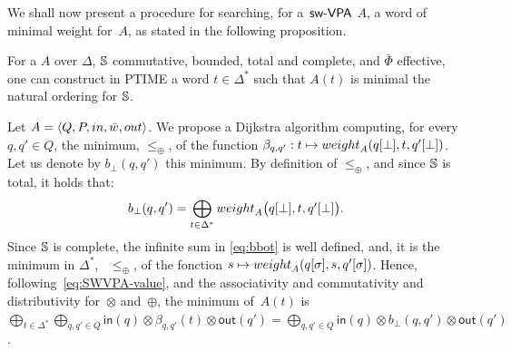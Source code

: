 \label{sec:best}\label{sec:search}
\noindent
We shall now present a procedure for searching, for a~$\textsf{sw-VPA}$ $A$,
a word %
of minimal weight for~$A$,
as stated in the following proposition. %
%
\begin{proposition}\label{th:best-search}
For a \SWVPA $A$
over $\Delta$,
$\mathbb{S}$ commutative, bounded, total and complete, %
and $\bar\Phi$ effective, %
one can construct in PTIME a word $t \in \Delta^*$
such that $A(t)$ is minimal \wrt the natural ordering for $\mathbb{S}$.
\end{proposition}
%
Let $A = \< Q, P, \init, \bar\wei, \final >$.
%
We propose a Dijkstra algorithm computing,
for every $q, q' \in Q$,
the minimum, \wrt $\leq_\oplus$, of the function
$\beta_{q, q'} : t \mapsto \weight_A(\config{q}{\bot}, t, \config{q'}{\bot})$.
Let us denote by $b_\bot(q, q')$ this minimum.
By definition of $\leq_\oplus$, and since $\mathbb{S}$ is total,
it holds that:
%
\begin{equation}\label{eq:bbot}
  b_\bot(q, q') = \bigoplus_{t\in \Delta^*}
  \textstyle
  \weight_A\bigl(\config{q}{\bot}, t, \config{q'}{\bot}\bigr).
\end{equation}
Since $\mathbb{S}$ is complete, the infinite sum in \eqref{eq:bbot} is well defined,
and,  it is the minimum in $\Delta^*$,
\wrt~$\leq_\oplus$, %
of the fonction
$s \mapsto \weight_A(\config{q}{\sigma}, s, \config{q'}{\sigma})$.
%
Hence, following~\eqref{eq:SWVPA-value}, and the associativity and commutativity
and distributivity for~$\otimes$ and~$\oplus$, the minimum of~$A(t)$ is
\(
{\displaystyle\bigoplus_{t\in \Delta^*}}
{\displaystyle\bigoplus_{q, q' \in Q}} \textstyle
\mathsf{in}(q) \mathop{\otimes}
\beta_{q, q'}(t)
\mathop{\otimes} \mathsf{out}(q')
=
{\displaystyle\bigoplus_{q, q' \in Q}} \textstyle
\mathsf{in}(q) \mathop{\otimes}
b_\bot(q, q')
\mathop{\otimes} \mathsf{out}(q')
\).

